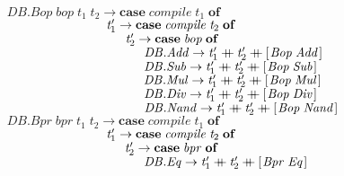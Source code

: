 \documentclass[10pt]{article}
\newcommand{\Conid}[1]{\mathit{#1}}
\newcommand{\Varid}[1]{\mathit{#1}}
\newcommand{\plus}{\mathbin{+\!\!\!+}}
\begin{document}
\begin{hscode}
${\phantom{\Varid{compile}\;\mbox{}}\Conid{\Conid{DB}.Bop}\;\Varid{bop}\;\Varid{t}_{1}\;\Varid{t}_{2}\to \mathbf{case}\;\Varid{compile}\;\Varid{t}_{1}\;\mathbf{of}}$\\
${\phantom{\Varid{compile}\;\mbox{}}\hskip8.00em\relax\Varid{t}_{1}'\to \mathbf{case}\;\Varid{compile}\;\Varid{t}_{2}\;\mathbf{of}}$\\
${\phantom{\Varid{compile}\;\mbox{}}\hskip8.00em\relax\hskip1.50em\relax\Varid{t}_{2}'\to \mathbf{case}\;\Varid{bop}\;\mathbf{of}}$\\
${\phantom{\Varid{compile}\;\mbox{}}\hskip8.00em\relax\hskip1.50em\relax\hskip1.50em\relax\Conid{\Conid{DB}.Add}\to \Varid{t}_{1}'\plus \Varid{t}_{2}'\plus [\mskip1.5mu \Conid{Bop}\;\Conid{Add}\mskip1.5mu]}$\\
${\phantom{\Varid{compile}\;\mbox{}}\hskip8.00em\relax\hskip1.50em\relax\hskip1.50em\relax\Conid{\Conid{DB}.Sub}\to \Varid{t}_{1}'\plus \Varid{t}_{2}'\plus [\mskip1.5mu \Conid{Bop}\;\Conid{Sub}\mskip1.5mu]}$\\
${\phantom{\Varid{compile}\;\mbox{}}\hskip8.00em\relax\hskip1.50em\relax\hskip1.50em\relax\Conid{\Conid{DB}.Mul}\to \Varid{t}_{1}'\plus \Varid{t}_{2}'\plus [\mskip1.5mu \Conid{Bop}\;\Conid{Mul}\mskip1.5mu]}$\\
${\phantom{\Varid{compile}\;\mbox{}}\hskip8.00em\relax\hskip1.50em\relax\hskip1.50em\relax\Conid{\Conid{DB}.Div}\to \Varid{t}_{1}'\plus \Varid{t}_{2}'\plus [\mskip1.5mu \Conid{Bop}\;\Conid{Div}\mskip1.5mu]}$\\
${\phantom{\Varid{compile}\;\mbox{}}\hskip8.00em\relax\hskip1.50em\relax\hskip1.50em\relax\Conid{\Conid{DB}.Nand}\to \Varid{t}_{1}'\plus \Varid{t}_{2}'\plus [\mskip1.5mu \Conid{Bop}\;\Conid{Nand}\mskip1.5mu]}$\\
${}$\\
${\phantom{\Varid{compile}\;\mbox{}}\Conid{\Conid{DB}.Bpr}\;\Varid{bpr}\;\Varid{t}_{1}\;\Varid{t}_{2}\to \mathbf{case}\;\Varid{compile}\;\Varid{t}_{1}\;\mathbf{of}}$\\
${\phantom{\Varid{compile}\;\mbox{}}\hskip8.00em\relax\Varid{t}_{1}'\to \mathbf{case}\;\Varid{compile}\;\Varid{t}_{2}\;\mathbf{of}}$\\
${\phantom{\Varid{compile}\;\mbox{}}\hskip8.00em\relax\hskip1.50em\relax\Varid{t}_{2}'\to \mathbf{case}\;\Varid{bpr}\;\mathbf{of}}$\\
${\phantom{\Varid{compile}\;\mbox{}}\hskip8.00em\relax\hskip1.50em\relax\hskip1.50em\relax\Conid{\Conid{DB}.Eq}\to \Varid{t}_{1}'\plus \Varid{t}_{2}'\plus [\mskip1.5mu \Conid{Bpr}\;\Conid{Eq}\mskip1.5mu]}$\\

\end{hscode}
\end{document}
